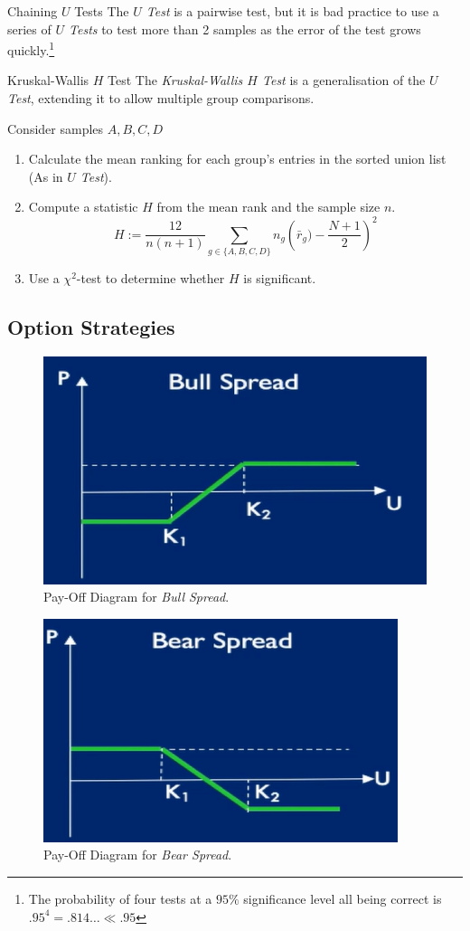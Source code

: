 \documentclass[11pt,a4paper]{article}
\begin{document}
  \begin{remark}{Chaining $U$ Tests}
    The \textit{$U$ Test} is a pairwise test, but it is bad practice to use a series of \textit{$U$ Tests} to test more than 2 samples as the error of the test grows quickly.\footnote{The probability of four tests at a $95\%$ significance level all being correct is $.95^4=.814\dots\ll.95$}
  \end{remark}

  \begin{definition}{Kruskal-Wallis $H$ Test}
    The \textit{Kruskal-Wallis $H$ Test} is a generalisation of the \textit{$U$ Test}, extending it to allow multiple group comparisons.
    \par Consider samples $A,B,C,D$
    \begin{enumerate}
      \item Calculate the mean ranking for each group's entries in the sorted union list (As in \textit{$U$ Test}).
      \item Compute a statistic $H$ from the mean rank and the sample size $n$.
      \[ H:=\frac{12}{n(n+1)}\sum_{g\in\{A,B,C,D\}}n_g\left(\bar{r}_g)-\frac{N+1}2\right)^2 \]
      \item Use a $\chi^2$-test to determine whether $H$ is significant.
    \end{enumerate}
  \end{definition}

\newpage
\subsection{Option Strategies} \label{sec_ReferenceOptionStrategies}

  \begin{figure}[ht!]
    \centering
    \includegraphics[width=.5\textwidth]{bullSpread.PNG}
    \caption{Pay-Off Diagram for \textit{Bull Spread}.}
    \label{fig_BullSpread}
  \end{figure}

  \begin{figure}[ht!]
    \centering
    \includegraphics[width=.5\textwidth]{bearSpread.PNG}
    \caption{Pay-Off Diagram for \textit{Bear Spread}.}
    \label{fig_BearSpread}
  \end{figure}
\end{document}

